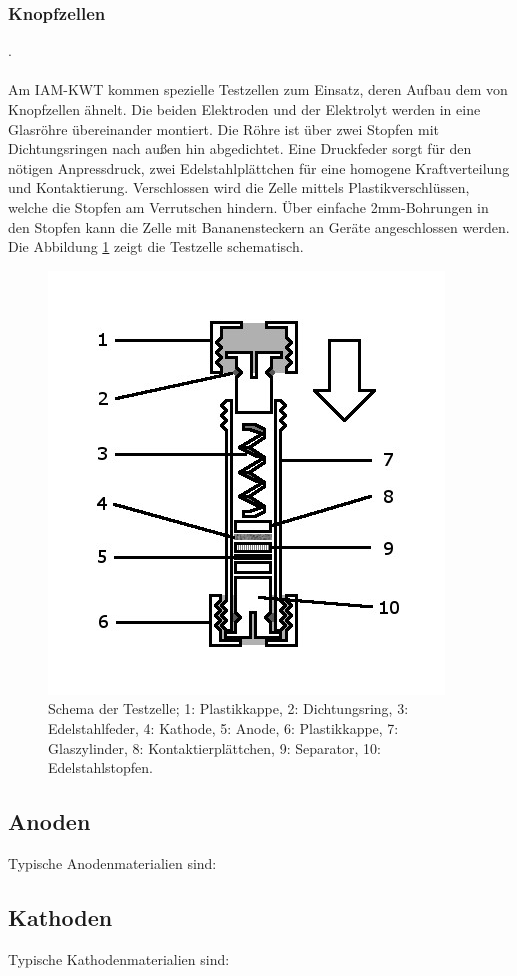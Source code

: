 \documentclass[a4paper, 11pt, headsepline,footsepline,twoside,abstract]{scrbook}
\begin{document}
\subsubsection{Knopfzellen}
.
\\\\
Am IAM-KWT kommen spezielle Testzellen zum Einsatz, deren Aufbau dem von Knopfzellen ähnelt. Die beiden Elektroden und der Elektrolyt werden in eine Glasröhre übereinander montiert. Die Röhre ist über zwei Stopfen mit Dichtungsringen nach außen hin abgedichtet. Eine Druckfeder sorgt für den nötigen Anpressdruck, zwei Edelstahlplättchen für eine homogene Kraftverteilung und Kontaktierung. Verschlossen wird die Zelle mittels Plastikverschlüssen, welche die Stopfen am Verrutschen hindern. Über einfache 2mm-Bohrungen in den Stopfen kann die Zelle mit Bananensteckern an Geräte angeschlossen werden. Die Abbildung \ref{schema_zelle} zeigt die Testzelle schematisch.
\begin{figure}[h]
	\centering
	\includegraphics[width=0.7\columnwidth]{images/Schema_Zelle.jpg}
	\caption{Schema der Testzelle; 
			1: Plastikkappe,
			2: Dichtungsring,
			3: Edelstahlfeder,
			4: Kathode,
			5: Anode,
			6: Plastikkappe,
			7: Glaszylinder,
			8: Kontaktierplättchen,
			9: Separator,
			10: Edelstahlstopfen.
			}
	\label{schema_zelle}
\end{figure}
\subsection{Anoden}
Typische Anodenmaterialien sind:
\subsection{Kathoden}
Typische Kathodenmaterialien sind:
\end{document}

